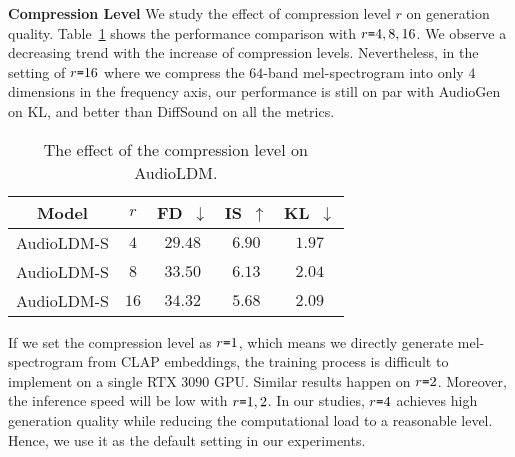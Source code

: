 \documentclass{article}
\begin{document}
\textbf{Compression Level} We study the effect of compression level $r$ on generation quality. Table~\ref{tab: compressionratio} shows the performance comparison with $r\texttt{=}4,8,16$. We observe a decreasing trend with the increase of compression levels. Nevertheless, in the setting of $r\texttt{=}16$ where we compress the $64$-band mel-spectrogram into only $4$ dimensions in the frequency axis, our performance is still on par with AudioGen on KL, and better than DiffSound on all the metrics.

\begin{table}[htbp]
\centering
\small
\begin{tabular}{ccccc}
\toprule
Model         & $r$ & FD~$\downarrow$   & IS~$\uparrow$   & KL~$\downarrow$   \\
\midrule
AudioLDM-S & $4$          & $\mathbf{29.48}$ & $\mathbf{6.90}$ & $\mathbf{1.97}$ \\
AudioLDM-S & $8$          & $33.50$  & $6.13$ & $2.04$ \\
AudioLDM-S & $16$         & $34.32$  & $5.68$ & $2.09$ \\
\bottomrule
\end{tabular}
\caption{The effect of the compression level on AudioLDM.}
\label{tab: compressionratio}
\end{table}

If we set the compression level as $r\texttt{=}1$, which means we directly generate mel-spectrogram from CLAP embeddings, the training process is difficult to implement on a single RTX $3090$ GPU. Similar results happen on $r\texttt{=}2$. Moreover, the inference speed will be low with $r\texttt{=}1,2$. In our studies, $r\texttt{=}4$ achieves high generation quality while reducing the computational load to a reasonable level. Hence, we use it as the default setting in our experiments.
\end{document}
